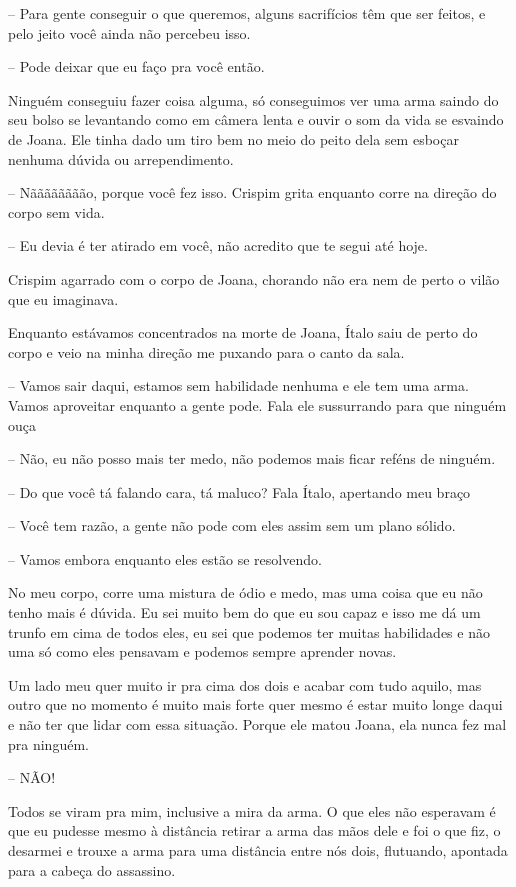-- Para gente conseguir o que queremos, alguns sacrifícios têm que ser feitos, e pelo jeito você ainda não percebeu isso.

-- Pode deixar que eu faço pra você então.

Ninguém conseguiu fazer coisa alguma, só conseguimos ver uma arma saindo do seu bolso se levantando como em câmera lenta e ouvir o som da vida se esvaindo de Joana. Ele tinha dado um tiro bem no meio do peito dela sem esboçar nenhuma dúvida ou arrependimento.

-- Nãããããããão, porque você fez isso. Crispim grita enquanto corre na direção do corpo sem vida.

-- Eu devia é ter atirado em você, não acredito que te segui até hoje.

Crispim agarrado com o corpo de Joana, chorando não era nem de perto o vilão que eu imaginava.

Enquanto estávamos concentrados na morte de Joana, Ítalo saiu de perto do corpo e veio na minha direção me puxando para o canto da sala. 

-- Vamos sair daqui, estamos sem habilidade nenhuma e ele tem uma arma. Vamos aproveitar enquanto a gente pode. Fala ele sussurrando para que ninguém ouça

-- Não, eu não posso mais ter medo, não podemos mais ficar reféns de ninguém. 

-- Do que você tá falando cara, tá maluco? Fala Ítalo, apertando meu braço

-- Você tem razão, a gente não pode com eles assim sem um plano sólido.

-- Vamos embora enquanto eles estão se resolvendo.

No meu corpo, corre uma mistura de ódio e medo, mas uma coisa que eu não tenho mais é dúvida. Eu sei muito bem do que eu sou capaz e isso me dá um trunfo em cima de todos eles, eu sei que podemos ter muitas habilidades e não uma só como eles pensavam e podemos sempre aprender novas.

Um lado meu quer muito ir pra cima dos dois e acabar com tudo aquilo, mas outro que no momento é muito mais forte quer mesmo é estar muito longe daqui e não ter que lidar com essa situação. Porque ele matou Joana, ela nunca fez mal pra ninguém.

-- NÃO!

Todos se viram pra mim, inclusive a mira da arma. O que eles não esperavam é que eu pudesse mesmo à distância retirar a arma das mãos dele e foi o que fiz, o desarmei e trouxe a arma para uma distância entre nós dois, flutuando, apontada para a cabeça do assassino.

